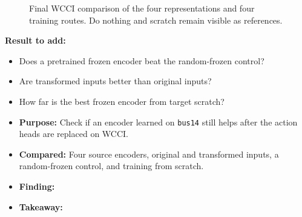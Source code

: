 \begin{figure}[H]
  \centering
  \caption{Final WCCI comparison of the four representations and four training
  routes. Do nothing and scratch remain visible as references.}
  \label{fig:encoder-transfer-endpoints}
\end{figure}

\noindent\textbf{Result to add:}
\begin{itemize}
  \item Does a pretrained frozen encoder beat the random-frozen control?
  \item Are transformed inputs better than original inputs?
  \item How far is the best frozen encoder from target scratch?
\end{itemize}

\begin{tcolorbox}[
  colframe=red!75!black,
  colback=red!5!white,
  title=Chapter 9 Summary: Encoder-Only Transfer]
\color{red}
\begin{itemize}
  \item \textbf{Purpose:} Check if an encoder learned on \texttt{bus14} still
  helps after the action heads are replaced on WCCI.
  \item \textbf{Compared:} Four source encoders, original and transformed
  inputs, a random-frozen control, and training from scratch.
  \item \textbf{Finding:} 
  \item \textbf{Takeaway:} 
\end{itemize}
\end{tcolorbox}

\endgroup
